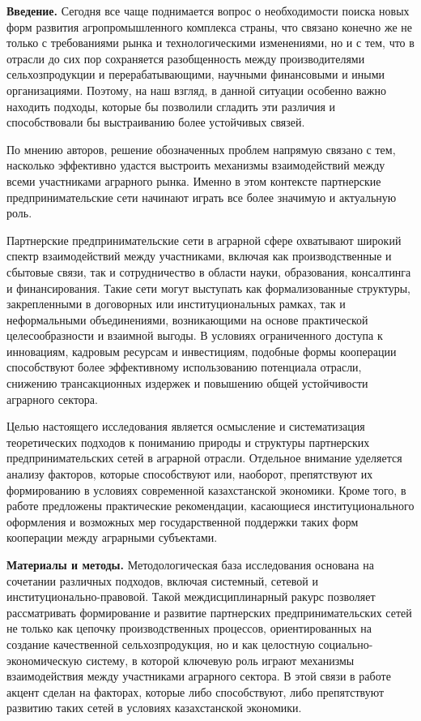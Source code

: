 \begin{multicols}{2}
{\bfseries Введение.} Сегодня все чаще поднимается вопрос о необходимости
поиска новых форм развития агропромышленного комплекса страны, что
связано конечно же не только с требованиями рынка и технологическими
изменениями, но и с тем, что в отрасли до сих пор сохраняется
разобщенность между производителями сельхозпродукции и
перерабатывающими, научными финансовыми и иными организациями. Поэтому,
на наш взгляд, в данной ситуации особенно важно находить подходы,
которые бы позволили сгладить эти различия и способствовали бы
выстраиванию более устойчивых связей.

По мнению авторов, решение обозначенных проблем напрямую связано с тем,
насколько эффективно удастся выстроить механизмы взаимодействий между
всеми участниками аграрного рынка. Именно в этом контексте партнерские
предпринимательские сети начинают играть все более значимую и актуальную
роль.

Партнерские предпринимательские сети в аграрной сфере охватывают широкий
спектр взаимодействий между участниками, включая как производственные и
сбытовые связи, так и сотрудничество в области науки, образования,
консалтинга и финансирования. Такие сети могут выступать как
формализованные структуры, закрепленными в договорных или
институциональных рамках, так и неформальными объединениями,
возникающими на основе практической целесообразности и взаимной выгоды.
В условиях ограниченного доступа к инновациям, кадровым ресурсам и
инвестициям, подобные формы кооперации способствуют более эффективному
использованию потенциала отрасли, снижению трансакционных издержек и
повышению общей устойчивости аграрного сектора.

Целью настоящего исследования является осмысление и систематизация
теоретических подходов к пониманию природы и структуры партнерских
предпринимательских сетей в аграрной отрасли. Отдельное внимание
уделяется анализу факторов, которые способствуют или, наоборот,
препятствуют их формированию в условиях современной казахстанской
экономики. Кроме того, в работе предложены практические рекомендации,
касающиеся институционального оформления и возможных мер государственной
поддержки таких форм кооперации между аграрными субъектами.

{\bfseries Материалы и методы.} Методологическая база исследования основана
на сочетании различных подходов, включая системный, сетевой и
институционально-правовой. Такой междисциплинарный ракурс позволяет
рассматривать формирование и развитие партнерских предпринимательских
сетей не только как цепочку производственных процессов, ориентированных
на создание качественной сельхозпродукция, но и как целостную
социально-экономическую систему, в которой ключевую роль играют
механизмы взаимодействия между участниками аграрного сектора. В этой
связи в работе акцент сделан на факторах, которые либо способствуют,
либо препятствуют развитию таких сетей в условиях казахстанской
экономики.


\end{multicols}
